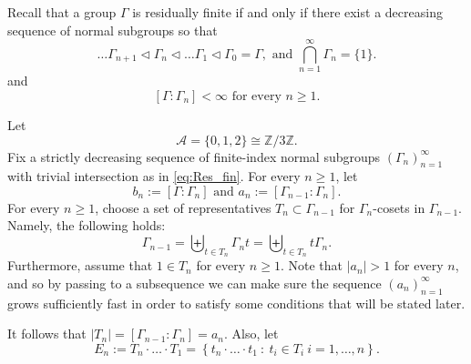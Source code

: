 \documentclass[oneside,english]{amsart}
\theoremstyle{definition}
\newcommand{\AAA}{\mathcal{A}}
\newcommand{\ZZ}{\mathbb{Z}}
\begin{document}
Recall that a group $\Gamma$ is residually finite if and only if there exist a decreasing sequence of normal subgroups so that
\begin{equation}\label{eq:Res_fin}
\ldots \Gamma_{n+1} \lhd \Gamma_n \lhd \ldots \Gamma_1 \lhd \Gamma_0 = \Gamma, \mbox{ and } \bigcap_{n=1}^\infty \Gamma_n= \{1\}.
\end{equation}
and
\begin{equation}\label{eq:Res_fin_2}
[\Gamma:\Gamma_n] < \infty \mbox{ for every } n \ge 1.
\end{equation}


Let
\begin{equation}
\AAA= \{0,1,2\} \cong \ZZ/3\ZZ.
\end{equation}
Fix a strictly decreasing sequence of finite-index normal  subgroups $(\Gamma_n)_{n=1}^\infty$ with trivial intersection as in \eqref{eq:Res_fin}. For every $n \ge 1$, let
\begin{equation}
b_n := [\Gamma:\Gamma_n] \mbox{ and } a_n := [\Gamma_{n-1}:\Gamma_{n}].
\end{equation}
For every $n \ge 1$, choose  a set of representatives  $T_n \subset \Gamma_{n-1}$ for $\Gamma_{n}$-cosets in $\Gamma_{n-1}$. Namely, the following holds:
\begin{equation}\label{eq:T_n_g_N}
\Gamma_{n-1} = \biguplus_{t \in T_n}\Gamma_{n}t=\biguplus_{t \in T_n}t\Gamma_{n}.
\end{equation}
Furthermore, assume that  $1 \in  T_n$ for every $n \ge 1$.
Note that $|a_n| > 1$ for every $n$, and so by passing to a subsequence we can make sure the sequence $(a_n)_{n=1}^\infty$ grows sufficiently fast in order to satisfy some conditions that will be stated later.


It follows that $|T_n|= [\Gamma_{n-1}:\Gamma_{n}]= a_n$.
Also, let
\begin{equation}\label{eq:E_n_def}
E_{n} := T_n\cdot \ldots \cdot T_1 = \left\{ t_n\cdot\ldots\cdot t_1~:~ t_i \in T_i ~ i =1,\ldots,n\right\}.
\end{equation}
\end{document}
